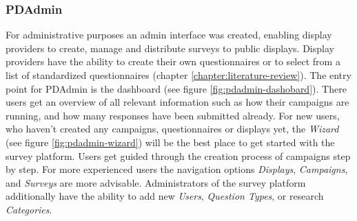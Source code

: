 	\subsubsection{PDAdmin}

		For administrative purposes an admin interface was created, enabling display providers to create, manage and distribute surveys to public displays. Display providers have the ability to create their own questionnaires or to select from a list of standardized questionnaires (chapter \ref{chapter:literature-review}).
		The entry point for PDAdmin is the dashboard (see figure \ref{fig:pdadmin-dashobard}). There users get an overview of all relevant information such as how their campaigns are running, and how many responses have been submitted already. 
		For new users, who haven't created any campaigns, questionnaires or displays yet, the \textit{Wizard} (see figure \ref{fig:pdadmin-wizard}) will be the best place to get started with the survey platform. Users get guided through the creation process of campaigns step by step.
		For more experienced users the navigation options \textit{Displays}, \textit{Campaigns}, and \textit{Surveys} are more advisable. 
		Administrators of the survey platform additionally have the ability to add new \textit{Users}, \textit{Question Types}, or research \textit{Categories}.







